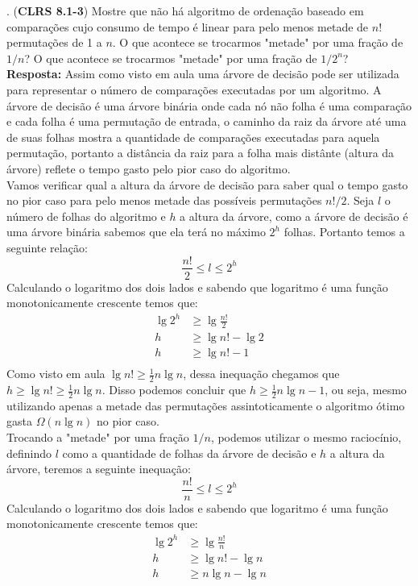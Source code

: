 
. (\textbf{CLRS 8.1-3}) Mostre que não há algoritmo de ordenação 
baseado em comparações cujo consumo de tempo é linear para pelo menos metade de 
$n!$ permutações de 1 a $n$. O que acontece se trocarmos "metade" por uma fração 
de $1/n$? O que acontece se trocarmos "metade" por uma fração de $1/2^n$?
\\ [6pt]
\textbf{Resposta:} Assim como visto em aula uma árvore de decisão pode ser 
utilizada para representar o número de comparações executadas por um algoritmo. 
A árvore de decisão é uma árvore binária onde cada nó não folha é uma comparação 
e cada folha é uma permutação de entrada, o caminho da raiz da árvore até uma de 
suas folhas mostra a quantidade de comparações executadas para aquela 
permutação, portanto a distância da raiz para a folha mais distânte (altura da 
árvore) reflete o tempo gasto pelo pior caso do algoritmo.
\\[6pt]
Vamos verificar qual a altura da árvore de decisão para saber qual o tempo gasto 
no pior caso para pelo menos metade das possíveis permutações $n!/2$. Seja $l$ o 
número de folhas do algoritmo e $h$ a altura da árvore, como a árvore de decisão 
é uma árvore binária sabemos que ela terá no máximo $2^h$ folhas. Portanto temos 
a seguinte relação:
\[ \frac{n!}{2} \leq l \leq 2^h \]
Calculando o logaritmo dos dois lados e sabendo que logaritmo é uma função 
monotonicamente crescente temos que:
\begin{align*}
     \lg 2^h  &\geq  \lg \frac{n!}{2} \\
     h & \geq \lg n! - \lg 2 \\
     h & \geq \lg n! - 1 \\
\end{align*}
Como visto em aula $\lg n! \geq \frac{1}{2} n \lg n$, dessa inequação chegamos 
que $h \geq \lg n! \geq \frac{1}{2} n \lg n$. Disso podemos concluir que $h \geq 
\frac{1}{2} n \lg n - 1$, ou seja, mesmo utilizando apenas a metade das 
permutações assintoticamente o algoritmo ótimo gasta $\Omega(n \lg n)$ no pior 
caso.
\\[6pt]
Trocando a "metade" por uma fração $1/n$, podemos utilizar o mesmo raciocínio, 
definindo $l$ como a quantidade de folhas da árvore de decisão e $h$ a altura da 
árvore, teremos a seguinte inequação:
\[ \frac{n!}{n} \leq l \leq 2^h \]
Calculando o logaritmo dos dois lados e sabendo que logaritmo é uma função 
monotonicamente crescente temos que:
\begin{align*}
     \lg 2^h  &\geq  \lg \frac{n!}{n} \\
     h & \geq \lg n! - \lg n  \\
     h & \geq n\lg n - \lg n \\
\end{align*}
